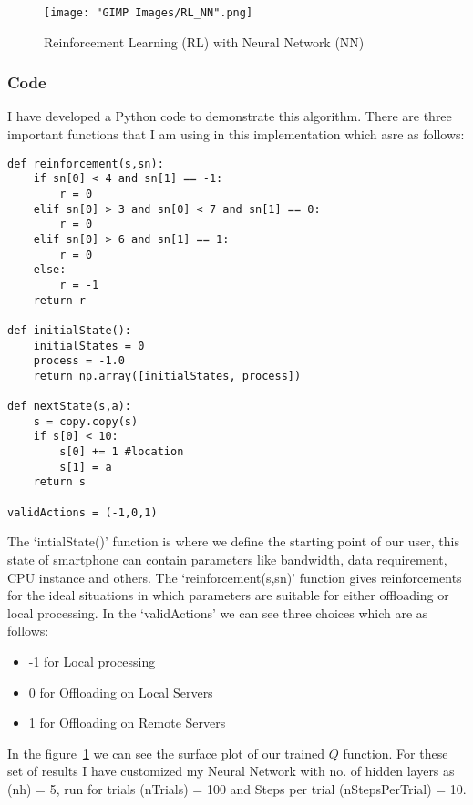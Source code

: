 \documentclass[12pt]{report}
\begin{document}
\begin{figure}[h!]
  \centering
  \texttt{[image: "GIMP Images/RL\_NN".png]}
  \caption{Reinforcement Learning (RL) with Neural Network (NN)}
  \label{fig:RL_NN}
\end{figure}

\subsubsection{Code}
I have developed a Python code to demonstrate this algorithm. There are three important functions that I am using in this implementation which asre as follows:
\begin{small}
\begin{lstlisting}
def reinforcement(s,sn):
    if sn[0] < 4 and sn[1] == -1:
        r = 0
    elif sn[0] > 3 and sn[0] < 7 and sn[1] == 0:
        r = 0
    elif sn[0] > 6 and sn[1] == 1:
        r = 0
    else:
        r = -1  
    return r       

def initialState():
    initialStates = 0
    process = -1.0
    return np.array([initialStates, process])

def nextState(s,a):
    s = copy.copy(s)
    if s[0] < 10:
        s[0] += 1 #location
        s[1] = a
    return s

validActions = (-1,0,1)
\end{lstlisting}
\end{small}

The `intialState()' function is where we define the starting point of our user, this state of smartphone can contain parameters like bandwidth, data requirement, CPU instance and others. The `reinforcement(s,sn)' function gives reinforcements for the ideal situations in which parameters are suitable for either offloading or local processing.
In the `validActions' we can see three choices which are as follows:
\begin{itemize}
   \item -1 for Local processing
   \item 0 for Offloading on Local Servers
   \item 1 for Offloading on Remote Servers
\end{itemize}      



In the figure~\ref{fig:RL_NN} we can see the surface plot of our trained $Q$ function. For these set of results I have customized my Neural Network with no. of hidden layers as (nh) = 5, run for trials (nTrials) = 100 and Steps per trial (nStepsPerTrial) = 10. \par
\end{document}
